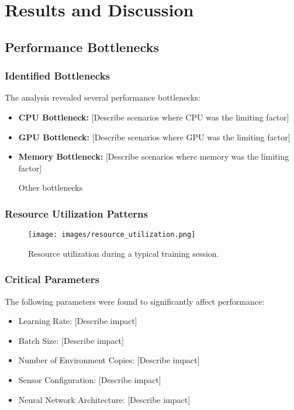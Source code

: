 \section{Results and Discussion}

\subsection{Performance Bottlenecks}

\subsubsection{Identified Bottlenecks}
The analysis revealed several performance bottlenecks:
\begin{itemize}
    \item \textbf{CPU Bottleneck:} [Describe scenarios where CPU was the limiting factor]
    \item \textbf{GPU Bottleneck:} [Describe scenarios where GPU was the limiting factor]
    \item \textbf{Memory Bottleneck:} [Describe scenarios where memory was the limiting factor]
    \item [Other bottlenecks]
\end{itemize}

\subsubsection{Resource Utilization Patterns}
\begin{figure}[h]
    \centering
    \texttt{[image: images/resource\_utilization.png]}
    \caption{Resource utilization during a typical training session.}
    \label{fig:resource_utilization}
\end{figure}

\subsubsection{Critical Parameters}
The following parameters were found to significantly affect performance:
\begin{itemize}
    \item Learning Rate: [Describe impact]
    \item Batch Size: [Describe impact]
    \item Number of Environment Copies: [Describe impact]
    \item Sensor Configuration: [Describe impact]
    \item Neural Network Architecture: [Describe impact]
\end{itemize}

